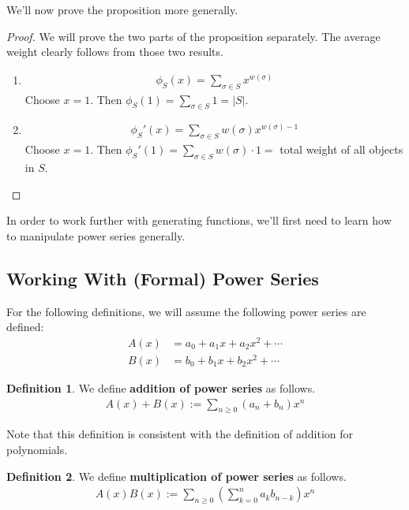 \documentclass[]{article}
\theoremstyle{definition}
\newtheorem*{defn}{Definition}
\begin{document}
			We'll now prove the proposition more generally.
			\begin{proof}
				We will prove the two parts of the proposition separately. The average weight clearly follows from those two results.
				\begin{enumerate}
					\item 
						\begin{align*}
							\phi_S(x) = \sum_{\sigma \in S} x^{w(\sigma)}
						\end{align*}
						Choose $x = 1$. Then $\phi_S(1) = \sum_{\sigma \in S} 1 = |S|$.

					\item 
						\begin{align*}
							\phi_S'(x) = \sum_{\sigma \in S} w(\sigma)x^{w(\sigma) - 1}
						\end{align*}
						Choose $x = 1$. Then $\phi_S'(1) = \sum_{\sigma \in S} w(\sigma) \cdot 1 = $ total weight of all objects in $S$.
				\end{enumerate}
			\end{proof}

			In order to work further with generating functions, we'll first need to learn how to manipulate power series generally.
		\subsection{Working With (Formal) Power Series}
			For the following definitions, we will assume the following power series are defined:
			\begin{align*}
				A(x) &= a_0 + a_1x + a_2x^2 + \cdots \\
				B(x) &= b_0 + b_1x + b_2x^2 + \cdots
			\end{align*}

			\begin{defn}
				We define \textbf{addition of power series} as follows.
				\begin{align*}
					A(x) + B(x) := \sum_{n \ge 0} (a_n + b_n)x^n
				\end{align*}

				Note that this definition is consistent with the definition of addition for polynomials.
			\end{defn}

			\begin{defn}
				We define \textbf{multiplication of power series} as follows.
				\begin{align*}
					A(x)B(x) := \sum_{n \ge 0} \left( \sum_{k = 0}^{n} a_k b_{n - k} \right) x^n
				\end{align*}
			\end{defn}
\end{document}
